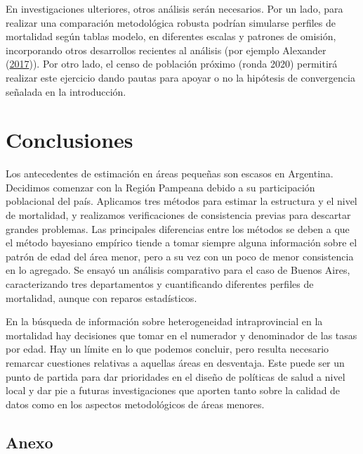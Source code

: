\documentclass[12pt,spanish,]{article}
\begin{document}
En investigaciones ulteriores, otros análisis serán necesarios. Por un
lado, para realizar una comparación metodológica robusta podrían
simularse perfiles de mortalidad según tablas modelo, en diferentes
escalas y patrones de omisión, incorporando otros desarrollos recientes
al análisis (por ejemplo Alexander
(\protect\hyperlink{ref-Alexander2017}{2017})). Por otro lado, el censo
de población próximo (ronda 2020) permitirá realizar este ejercicio
dando pautas para apoyar o no la hipótesis de convergencia señalada en
la introducción.

\hypertarget{conclusiones}{%
\section{Conclusiones}\label{conclusiones}}

Los antecedentes de estimación en áreas pequeñas son escasos en
Argentina. Decidimos comenzar con la Región Pampeana debido a su
participación poblacional del país. Aplicamos tres métodos para estimar
la estructura y el nivel de mortalidad, y realizamos verificaciones de
consistencia previas para descartar grandes problemas. Las principales
diferencias entre los métodos se deben a que el método bayesiano
empírico tiende a tomar siempre alguna información sobre el patrón de
edad del área menor, pero a su vez con un poco de menor consistencia en
lo agregado. Se ensayó un análisis comparativo para el caso de Buenos
Aires, caracterizando tres departamentos y cuantificando diferentes
perfiles de mortalidad, aunque con reparos estadísticos.

En la búsqueda de información sobre heterogeneidad intraprovincial en la
mortalidad hay decisiones que tomar en el numerador y denominador de las
tasas por edad. Hay un límite en lo que podemos concluir, pero resulta
necesario remarcar cuestiones relativas a aquellas áreas en desventaja.
Este puede ser un punto de partida para dar prioridades en el diseño de
políticas de salud a nivel local y dar pie a futuras investigaciones que
aporten tanto sobre la calidad de datos como en los aspectos
metodológicos de áreas menores.

\hypertarget{anexo}{%
\subsection{Anexo}\label{anexo}}
\end{document}
